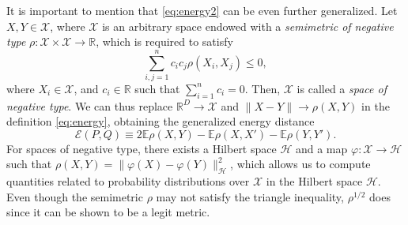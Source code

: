\documentclass[aps,preprint,nofootinbib,floatfix]{revtex4-1}
\newcommand\Energy{\mathcal{E}}
\newcommand\E{\mathbb{E}}
\begin{document}
It is important to 
mention that \eqref{eq:energy2} can be even further generalized.
Let $X, Y \in \mathcal{X}$,  where $\mathcal{X}$ is an arbitrary space endowed
with a \emph{semimetric of negative type}
$\rho: \mathcal{X}\times\mathcal{X} \to \mathbb{R}$, which is required
to satisfy
\begin{equation}
\label{eq:negative_type}
\sum_{i,j=1}^n c_i c_j \rho(X_i, X_j) \le 0,
\end{equation}
where $X_i \in \mathcal{X}$, and $c_i \in \mathbb{R}$ such that
$\sum_{i=1}^n c_i = 0$. Then, $\mathcal{X}$ is called a \emph{space of
negative type}.
We can thus replace $\mathbb{R}^D \to \mathcal{X}$ and 
$\| X - Y \| \to \rho(X , Y)$ in the definition \eqref{eq:energy}, obtaining
the generalized energy distance
\begin{equation}
\label{eq:energy3}
\Energy(P, Q) \equiv 2 \E \rho(X,Y) - \E \rho(X, X') - \E \rho(Y,Y').
\end{equation}
For spaces of negative type, there exists a Hilbert space $\mathcal{H}$ and
a map $\varphi: \mathcal{X} \to
\mathcal{H}$ such that
$\rho(X, Y) = \| \varphi(X) - \varphi(Y) \|_{\mathcal{H}}^2$, which
allows us to compute quantities related to probability distributions over
$\mathcal{X}$ in the Hilbert space $\mathcal{H}$.
Even though the semimetric 
$\rho$ may not satisfy the triangle inequality, 
$\rho^{1/2}$ does since it can be shown to be a legit metric. 
\end{document}

